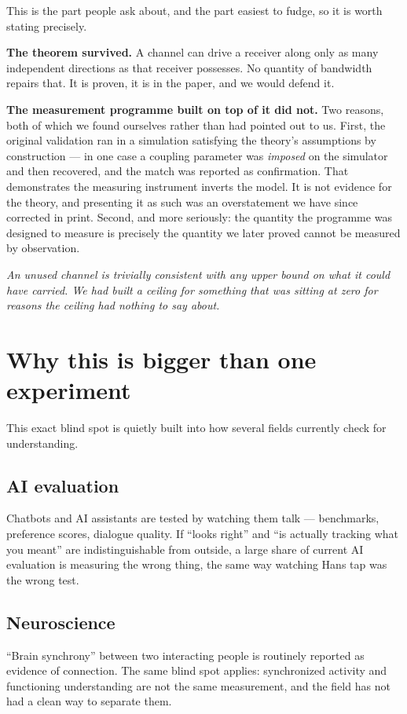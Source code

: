 \documentclass[11pt]{article}
\begin{document}
This is the part people ask about, and the part easiest to fudge, so it is worth stating precisely.

\textbf{The theorem survived.} A channel can drive a receiver along only as many independent directions as that receiver possesses. No quantity of bandwidth repairs that. It is proven, it is in the paper, and we would defend it.

\textbf{The measurement programme built on top of it did not.} Two reasons, both of which we found ourselves rather than had pointed out to us. First, the original validation ran in a simulation satisfying the theory's assumptions by construction --- in one case a coupling parameter was \emph{imposed} on the simulator and then recovered, and the match was reported as confirmation. That demonstrates the measuring instrument inverts the model. It is not evidence for the theory, and presenting it as such was an overstatement we have since corrected in print. Second, and more seriously: the quantity the programme was designed to measure is precisely the quantity we later proved cannot be measured by observation.

\begin{pullquote}
\textit{An unused channel is trivially consistent with any upper bound on what it could have carried. We had built a ceiling for something that was sitting at zero for reasons the ceiling had nothing to say about.}
\end{pullquote}

\section{Why this is bigger than one experiment}

This exact blind spot is quietly built into how several fields currently check for understanding.

\subsection*{AI evaluation}
Chatbots and AI assistants are tested by watching them talk --- benchmarks, preference scores, dialogue quality. If ``looks right'' and ``is actually tracking what you meant'' are indistinguishable from outside, a large share of current AI evaluation is measuring the wrong thing, the same way watching Hans tap was the wrong test.

\subsection*{Neuroscience}
``Brain synchrony'' between two interacting people is routinely reported as evidence of connection. The same blind spot applies: synchronized activity and functioning understanding are not the same measurement, and the field has not had a clean way to separate them.
\end{document}
